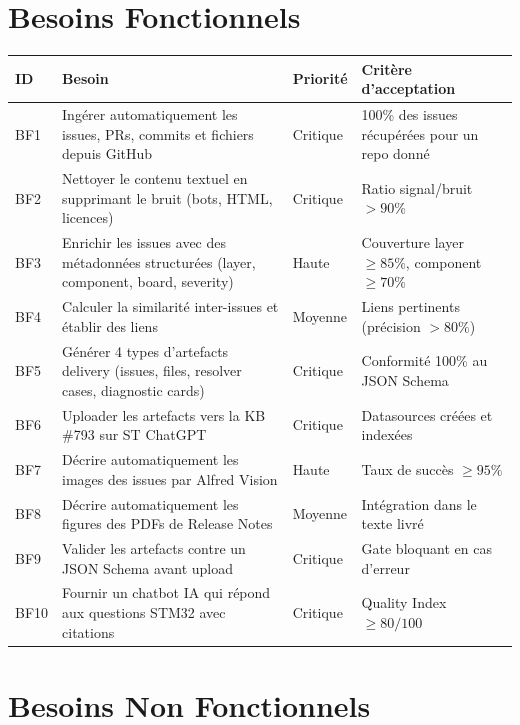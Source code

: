 \documentclass[12pt,a4paper]{report}
\begin{document}
\section{Besoins Fonctionnels}
\label{sec:besoins_fonctionnels}

\begin{longtable}{p{1cm}p{5cm}p{2cm}p{5cm}}
\toprule
\textbf{ID} & \textbf{Besoin} & \textbf{Priorité} & \textbf{Critère d'acceptation} \\
\midrule
BF1 & Ingérer automatiquement les issues, PRs, commits et fichiers depuis GitHub & Critique & 100\% des issues récupérées pour un repo donné \\
BF2 & Nettoyer le contenu textuel en supprimant le bruit (bots, HTML, licences) & Critique & Ratio signal/bruit $> 90\%$ \\
BF3 & Enrichir les issues avec des métadonnées structurées (layer, component, board, severity) & Haute & Couverture layer $\geq 85\%$, component $\geq 70\%$ \\
BF4 & Calculer la similarité inter-issues et établir des liens & Moyenne & Liens pertinents (précision $> 80\%$) \\
BF5 & Générer 4 types d'artefacts delivery (issues, files, resolver cases, diagnostic cards) & Critique & Conformité 100\% au JSON Schema \\
BF6 & Uploader les artefacts vers la KB \#793 sur ST ChatGPT & Critique & Datasources créées et indexées \\
BF7 & Décrire automatiquement les images des issues par Alfred Vision & Haute & Taux de succès $\geq 95\%$ \\
BF8 & Décrire automatiquement les figures des PDFs de Release Notes & Moyenne & Intégration dans le texte livré \\
BF9 & Valider les artefacts contre un JSON Schema avant upload & Critique & Gate bloquant en cas d'erreur \\
BF10 & Fournir un chatbot IA qui répond aux questions STM32 avec citations & Critique & Quality Index $\geq 80/100$ \\
\bottomrule
\end{longtable}

\section{Besoins Non Fonctionnels}
\label{sec:besoins_non_fonctionnels}
\end{document}
